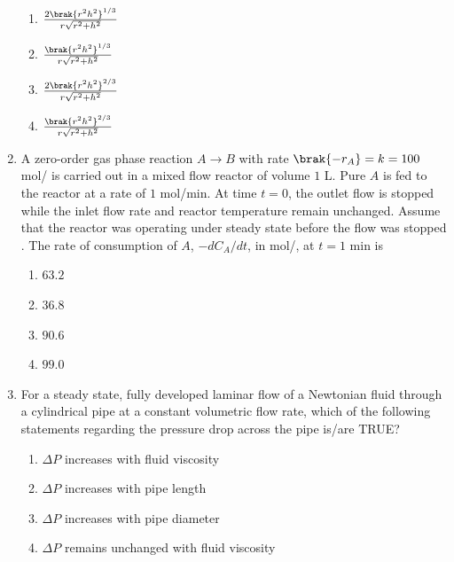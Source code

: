 \documentclass[journal,12pt,onecolumn]{IEEEtran}
\theoremstyle{remark}
\begin{document}
\begin{enumerate}
		\hfill{}
		
		\begin{enumerate}
			\item $\frac{2 \brak{r^2h^2}^{1/3}}{r\sqrt{r^2 + h^2}}$
			\item $\frac{\brak{r^2h^2}^{1/3}}{r\sqrt{r^2 + h^2}}$
			\item $\frac{2 \brak{r^2h^2}^{2/3}}{r\sqrt{r^2 + h^2}}$
			\item $\frac{\brak{r^2h^2}^{2/3}}{r\sqrt{r^2 + h^2}}$
		\end{enumerate}
		
		\item A zero-order gas phase reaction $A \rightarrow B$ with rate $\brak{-r_A} = k = 100$ mol/ is carried out in a mixed flow reactor of volume $1$ L. Pure $A$ is fed to the reactor at a rate of $1$ mol/min. At time $t = 0$, the outlet flow is stopped while the inlet flow rate and reactor temperature remain unchanged. Assume that the reactor was operating under steady state before the flow was stopped . The rate of consumption of $A$, $-dC_A/dt$, in mol/, at $t = 1$ min is
		
		\hfill{}
		
		\begin{multicols}{4}
			\begin{enumerate}
				\item $63.2$
				\item $36.8$
				\item $90.6$
				\item $99.0$
			\end{enumerate}
		\end{multicols}
		
		\item For a steady state, fully developed laminar flow of a Newtonian fluid through a cylindrical pipe at a constant volumetric flow rate, which of the following statements regarding the pressure drop across the pipe  is/are TRUE?
		
		\hfill{}
		
		\begin{enumerate}
			\item $\Delta P$ increases with fluid viscosity
			\item $\Delta P$ increases with pipe length
			\item $\Delta P$ increases with pipe diameter
			\item $\Delta P$ remains unchanged with fluid viscosity
		\end{enumerate}
		

\end{enumerate}
\end{document}
